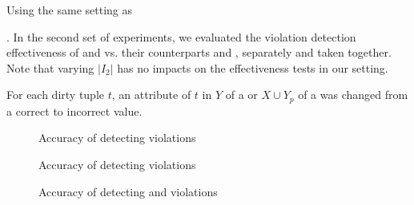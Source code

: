 Using the same setting as 







. In the second set of experiments, we evaluated the violation detection effectiveness of  \pCFDs and \pCINDs vs. their counterparts \pCFDs and \pCINDs, separately and taken together. Note that varying $|I_{2}|$ has no impacts on the effectiveness tests in our setting.


For each dirty tuple $t$, an attribute of $t$ in $Y$ of a \pCFD or $X \cup Y_p$ of a \pCIND was changed from a correct to incorrect value.



\begin{figure}[tb!]
  \centering
  \centering
  \quad
  \quad
  \quad
  \caption{Accuracy of detecting \pCFD violations}\label{fig_exp2_cfdp}
\end{figure}

\begin{figure}[tb!]
  \centering
  \centering
  \quad
  \quad
  \quad
  \caption{Accuracy of detecting \pCIND violations}\label{fig_exp2_cindp}
\end{figure}

\begin{figure}[tb!]
  \centering
  \quad
  \quad
  \quad
  \caption{Accuracy of detecting \pCFD and \pCIND violations}\label{fig_exp2_both}
\end{figure}

